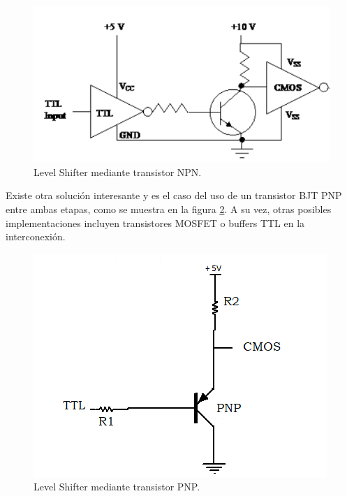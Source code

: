 \begin{figure}[H]
    \centering
    \includegraphics[scale=0.5]{figs/ej5/transistor_inter.png}
    \caption{Level Shifter mediante transistor NPN.}
    \label{ej5_fig:transistor_inter}
\end{figure}

\noindent
Existe otra soluci\'on interesante y es el caso del uso de un transistor BJT PNP entre ambas etapas, como se muestra en la figura \ref{ej5_fig:transistor_inter_pnp}. A su vez, otras posibles implementaciones incluyen transistores MOSFET o buffers TTL en la interconexi\'on. 

\begin{figure}[H]
    \centering
    \includegraphics[scale=0.5]{figs/ej5/Levelshifter.png}
    \caption{Level Shifter mediante transistor PNP.}
    \label{ej5_fig:transistor_inter_pnp}
\end{figure}

